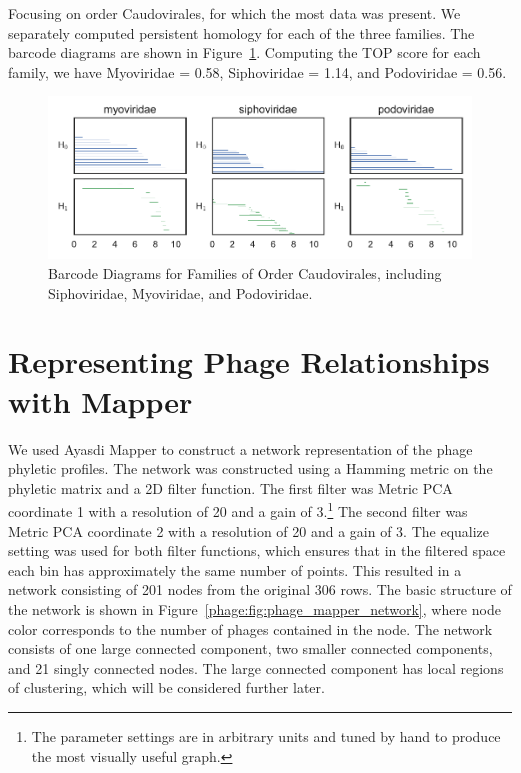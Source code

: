 Focusing on order Caudovirales, for which the most data was present.
We separately computed persistent homology for each of the three families.
The barcode diagrams are shown in Figure~\ref{phage:fig:caudovirales_barcodes}.
Computing the TOP score for each family, we have Myoviridae = 0.58, Siphoviridae = 1.14, and Podoviridae = 0.56.

\begin{figure}
\centering
\includegraphics[]{fig/phage/phage_s306_caudovirales_barcodes.pdf}
\caption[Caudovirales Barcode Diagrams]{Barcode Diagrams for Families of Order Caudovirales, including Siphoviridae, Myoviridae, and Podoviridae.}
\label{phage:fig:caudovirales_barcodes}
\end{figure}

\section{Representing Phage Relationships with Mapper}
\label{phage:mapper}

We used Ayasdi Mapper to construct a network representation of the phage phyletic profiles.
The network was constructed using a Hamming metric on the phyletic matrix and a 2D filter function.
The first filter was Metric PCA coordinate 1 with a resolution of 20 and a gain of 3.\footnote{The parameter settings are in arbitrary units and tuned by hand to produce the most visually useful graph.}
The second filter was Metric PCA coordinate 2 with a resolution of 20 and a gain of 3.
The equalize setting was used for both filter functions, which ensures that in the filtered space each bin has approximately the same number of points.
This resulted in a network consisting of 201 nodes from the original 306 rows.
The basic structure of the network is shown in Figure~\ref{phage:fig:phage_mapper_network}, where node color corresponds to the number of phages contained in the node.
The network consists of one large connected component, two smaller connected components, and 21 singly connected nodes.
The large connected component has local regions of clustering, which will be considered further later.

